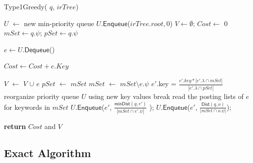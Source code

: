 \documentclass{sig-alternate}
\newcommand{\Dist}{\mbox{$\mathsf{Dist}$}\xspace}
\newcommand{\minDist}{\mbox{$\mathsf{minDist}$}\xspace}
\begin{document}
\begin{algorithm}[!t]\label{alg:greedyindex} \small
\caption{Type1Greedy( $q$, $irTree$)}\label{alg:subquery}

    $U$ $\leftarrow$ new min-priority queue\;
    $U$.$\mathsf{Enqueue}$($irTree.root,0$)\; $V \leftarrow \emptyset$; $Cost \leftarrow $ 0\;
    $mSet \leftarrow q.\psi$; $pSet \leftarrow q.\psi$\;

    {

        {
            $e \leftarrow U.$$\mathsf{Dequeue}$()\;

            $Cost \leftarrow Cost + e.Key$\;

            {
                $V$ $\leftarrow$ $V$ $\cup$ $e$\;
                $pSet$ $\leftarrow$ $mSet$ \;
                $mSet$ $\leftarrow$ $mSet \setminus e.\psi$\;
                {
                    {
                        $e'$.key = $\frac{e'.key * |e'.\lambda \cap mSet|}{|e'.\lambda \cap pSet|} $ \;
                    }
                }
                reorganize priority queue $U$ using new key values\;
                break\;
            }
            \Else
            {
                read the posting lists of $\mathit{e}$ for keywords in $mSet$\;
                {
                    {
                        {
                            $U$.$\mathsf{Enqueue}$($e'$, $\frac{\minDist(q,e')}{|mSet\cap e'.\psi|}$ );
                        }
                        \Else
                        {
                            $U$.$\mathsf{Enqueue}$($e'$, $\frac{\Dist(q,o)}{|mSet\cap o.\psi|} $);
                        }
                    }
                }
            }
        }
    }

    {\bf return} $Cost$ and $ V $ \vspace{-1ex}
\end{algorithm}


\subsection{Exact Algorithm}
\end{document}
